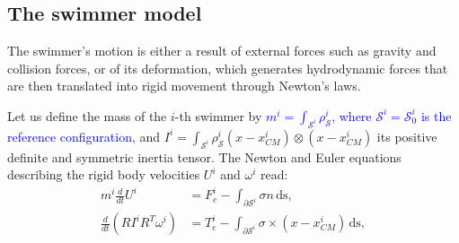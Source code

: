 \documentclass[graybox]{svmult}
\newcommand{\review}[1]{\textcolor{blue}{#1}}
\newcommand{\Real}{\mathbb{R}} %
\newcommand{\Density}{\rho} %
\newcommand{\tvel}{U} %
\newcommand{\angvel}{\omega} %
\newcommand{\Rmat}{R} %
\newcommand{\Inertia}{I} %
\newcommand{\mass}{m} %
\newcommand{\CenterMassi}{x_{CM}^i}
\newcommand{\Solid}{\mathcal{S}} %
\newcommand{\normal}{n} %
\begin{document}

\subsection{The swimmer model}


The swimmer's motion is either a result of external forces such as gravity and collision forces, or of its deformation, which generates hydrodynamic forces that are then translated into rigid movement through Newton's laws.

Let us define the mass of the $i$-th swimmer by  \review{$\mass^i = \int_{\Solid^i} \Density_{\Solid}^i$, where $\Solid^i = \Solid^i_0$ is the reference configuration}, %
and $\Inertia^i = \int_{\Solid^i} \Density_{\Solid}^i (x-\CenterMassi) \otimes (x-\CenterMassi)$ 
its positive definite and symmetric inertia tensor. 
The Newton and Euler equations describing the rigid body velocities $\tvel^i$ and $\angvel^i$ read:
\begin{equation}
	\begin{aligned}
		\mass^i \frac{d}{dt}\tvel^i &= F_e^i -\int_{\partial \Solid^i} \sigma \normal \,\textrm{ds},\\
		\frac{d}{dt}(\Rmat \Inertia^i \Rmat^T \angvel^i) &= T_e^i -\int_{\partial \Solid^i} \sigma \times (x-\CenterMassi)\,\textrm{ds}, 
	\end{aligned}
	\label{Eq:RB}
\end{equation}
\end{document}

